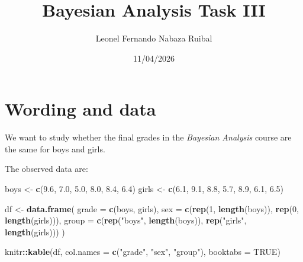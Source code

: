 \documentclass[
  12pt,
]{article}
\title{Bayesian Analysis Task III}
\author{Leonel Fernando Nabaza Ruibal}
\date{11/04/2026}
\newenvironment{Shaded}{\begin{snugshade}}{\end{snugshade}}
\newcommand{\AttributeTok}[1]{\textcolor[rgb]{0.13,0.29,0.53}{#1}}
\newcommand{\ConstantTok}[1]{\textcolor[rgb]{0.56,0.35,0.01}{#1}}
\newcommand{\DecValTok}[1]{\textcolor[rgb]{0.00,0.00,0.81}{#1}}
\newcommand{\FloatTok}[1]{\textcolor[rgb]{0.00,0.00,0.81}{#1}}
\newcommand{\FunctionTok}[1]{\textcolor[rgb]{0.13,0.29,0.53}{\textbf{#1}}}
\newcommand{\NormalTok}[1]{#1}
\newcommand{\OtherTok}[1]{\textcolor[rgb]{0.56,0.35,0.01}{#1}}
\newcommand{\SpecialCharTok}[1]{\textcolor[rgb]{0.81,0.36,0.00}{\textbf{#1}}}
\newcommand{\StringTok}[1]{\textcolor[rgb]{0.31,0.60,0.02}{#1}}
\begin{document}
\maketitle

{
\setcounter{tocdepth}{2}
\tableofcontents
}
\section{Wording and data}\label{wording-and-data}

We want to study whether the final grades in the \emph{Bayesian
Analysis} course are the same for boys and girls.

The observed data are:

\begin{Shaded}
\begin{Highlighting}[]
\NormalTok{boys  }\OtherTok{\textless{}{-}} \FunctionTok{c}\NormalTok{(}\FloatTok{9.6}\NormalTok{, }\FloatTok{7.0}\NormalTok{, }\FloatTok{5.0}\NormalTok{, }\FloatTok{8.0}\NormalTok{, }\FloatTok{8.4}\NormalTok{, }\FloatTok{6.4}\NormalTok{)}
\NormalTok{girls }\OtherTok{\textless{}{-}} \FunctionTok{c}\NormalTok{(}\FloatTok{6.1}\NormalTok{, }\FloatTok{9.1}\NormalTok{, }\FloatTok{8.8}\NormalTok{, }\FloatTok{5.7}\NormalTok{, }\FloatTok{8.9}\NormalTok{, }\FloatTok{6.1}\NormalTok{, }\FloatTok{6.5}\NormalTok{)}

\NormalTok{df }\OtherTok{\textless{}{-}} \FunctionTok{data.frame}\NormalTok{(}
  \AttributeTok{grade =} \FunctionTok{c}\NormalTok{(boys, girls),}
  \AttributeTok{sex   =} \FunctionTok{c}\NormalTok{(}\FunctionTok{rep}\NormalTok{(}\DecValTok{1}\NormalTok{, }\FunctionTok{length}\NormalTok{(boys)), }\FunctionTok{rep}\NormalTok{(}\DecValTok{0}\NormalTok{, }\FunctionTok{length}\NormalTok{(girls))),}
  \AttributeTok{group =} \FunctionTok{c}\NormalTok{(}\FunctionTok{rep}\NormalTok{(}\StringTok{"boys"}\NormalTok{, }\FunctionTok{length}\NormalTok{(boys)), }\FunctionTok{rep}\NormalTok{(}\StringTok{"girls"}\NormalTok{, }\FunctionTok{length}\NormalTok{(girls)))}
\NormalTok{)}

\NormalTok{knitr}\SpecialCharTok{::}\FunctionTok{kable}\NormalTok{(df, }\AttributeTok{col.names =} \FunctionTok{c}\NormalTok{(}\StringTok{"grade"}\NormalTok{, }\StringTok{"sex"}\NormalTok{, }\StringTok{"group"}\NormalTok{), }\AttributeTok{booktabs =} \ConstantTok{TRUE}\NormalTok{)}
\end{Highlighting}
\end{Shaded}
\end{document}
